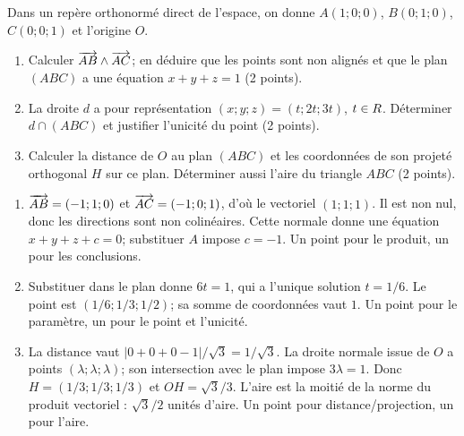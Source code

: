 Dans un repère orthonormé direct de l’espace, on donne $A(1;0;0)$, $B(0;1;0)$, $C(0;0;1)$ et l’origine $O$.
\begin{enumerate}
\item Calculer $\overrightarrow{AB}\wedge\overrightarrow{AC}$; en déduire que les points sont non alignés et que le plan $(ABC)$ a une équation $x+y+z=1$ (2 points).
\item La droite $d$ a pour représentation $(x;y;z)=(t;2t;3t)$, $t\in R$. Déterminer $d\cap(ABC)$ et justifier l’unicité du point (2 points).
\item Calculer la distance de $O$ au plan $(ABC)$ et les coordonnées de son projeté orthogonal $H$ sur ce plan. Déterminer aussi l’aire du triangle $ABC$ (2 points).
\end{enumerate}
\begin{corrige}\label{sol-t11s-ds3-e04}
\begin{enumerate}
\item $\overrightarrow{AB}=(-1;1;0)$ et $\overrightarrow{AC}=(-1;0;1)$, d’où le vectoriel $(1;1;1)$. Il est non nul, donc les directions sont non colinéaires. Cette normale donne une équation $x+y+z+c=0$; substituer $A$ impose $c=-1$. Un point pour le produit, un pour les conclusions.
\item Substituer dans le plan donne $6t=1$, qui a l’unique solution $t=1/6$. Le point est $(1/6;1/3;1/2)$; sa somme de coordonnées vaut $1$. Un point pour le paramètre, un pour le point et l’unicité.
\item La distance vaut $|0+0+0-1|/\sqrt3=1/\sqrt3$. La droite normale issue de $O$ a points $(\lambda;\lambda;\lambda)$; son intersection avec le plan impose $3\lambda=1$. Donc $H=(1/3;1/3;1/3)$ et $OH=\sqrt3/3$. L’aire est la moitié de la norme du produit vectoriel : $\sqrt3/2$ unités d’aire. Un point pour distance/projection, un pour l’aire.
\end{enumerate}
\end{corrige}
\endgroup
